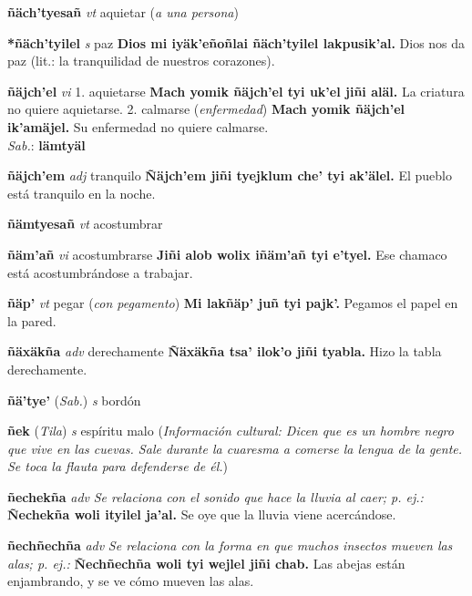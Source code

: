 \documentclass[10pt]{scrbook}
\newcommand{\entry}[1]{\textbf{#1}}
\newcommand{\onedefinition}[1]{#1.}
\newcommand{\nontranslationdef}[1]{\textit{#1}}
\newcommand{\partofspeech}[1]{\textit{#1}}
\newcommand{\spanishtranslation}[1]{#1}
\newcommand{\clarification}[1]{(\textit{#1})}
\newcommand{\cholexample}[1]{\textbf{#1}}
\newcommand{\exampletranslation}[1]{#1}
\newcommand{\dialectvariant}[1]{\\\textit{#1}:}
\newcommand{\dialectword}[1]{\textbf{#1}}
\newcommand{\relevantdialect}[1]{(\textit{#1})}
\newcommand{\culturalinformation}[1]{(\textit{#1})}
\begin{document}
\begin{multicols}{2}
\entry{ñäch'tyesañ}
\partofspeech{vt}
\spanishtranslation{aquietar}
\clarification{a una persona}

\entry{*ñäch'tyilel}
\partofspeech{s}
\spanishtranslation{paz}
\cholexample{Dios mi iyäk'eñoñlai ñäch'tyilel lakpusik'al.}
\exampletranslation{Dios nos da paz (lit.: la tranquilidad de nuestros corazones).}

\entry{ñäjch'el}
\partofspeech{vi}
\onedefinition{1}
\spanishtranslation{aquietarse}
\cholexample{Mach yomik ñäjch'el tyi uk'el jiñi aläl.}
\exampletranslation{La criatura no quiere aquietarse.}
\onedefinition{2}
\spanishtranslation{calmarse}
\clarification{enfermedad}
\cholexample{Mach yomik ñäjch'el ik'amäjel.}
\exampletranslation{Su enfermedad no quiere calmarse.}
\dialectvariant{Sab.}
\dialectword{lämtyäl}

\entry{ñäjch'em}
\partofspeech{adj}
\spanishtranslation{tranquilo}
\cholexample{Ñäjch'em jiñi tyejklum che' tyi ak'älel.}
\exampletranslation{El pueblo está tranquilo en la noche.}

\entry{ñämtyesañ}
\partofspeech{vt}
\spanishtranslation{acostumbrar}

\entry{ñäm'añ}
\partofspeech{vi}
\spanishtranslation{acostumbrarse}
\cholexample{Jiñi alob wolix iñäm'añ tyi e'tyel.}
\exampletranslation{Ese chamaco está acostumbrándose a trabajar.}

\entry{ñäp'}
\partofspeech{vt}
\spanishtranslation{pegar}
\clarification{con pegamento}
\cholexample{Mi lakñäp' juñ tyi pajk'.}
\exampletranslation{Pegamos el papel en la pared.}

\entry{ñäxäkña}
\partofspeech{adv}
\spanishtranslation{derechamente}
\cholexample{Ñäxäkña tsa' ilok'o jiñi tyabla.}
\exampletranslation{Hizo la tabla derechamente.}

\entry{ñä'tye'}
\relevantdialect{Sab.}
\partofspeech{s}
\spanishtranslation{bordón}

\entry{ñek}
\relevantdialect{Tila}
\partofspeech{s}
\spanishtranslation{espíritu malo}
\culturalinformation{Información cultural: Dicen que es un hombre negro que vive en las cuevas. Sale durante la cuaresma a comerse la lengua de la gente. Se toca la flauta para defenderse de él.}

\entry{ñechekña}
\partofspeech{adv}
\nontranslationdef{Se relaciona con el sonido que hace la lluvia al caer; p. ej.:}
\cholexample{Ñechekña woli ityilel ja'al.}
\exampletranslation{Se oye que la lluvia viene acercándose.}

\entry{ñechñechña}
\partofspeech{adv}
\nontranslationdef{Se relaciona con la forma en que muchos insectos mueven las alas; p. ej.:}
\cholexample{Ñechñechña woli tyi wejlel jiñi chab.}
\exampletranslation{Las abejas están enjambrando, y se ve cómo mueven las alas.}


\end{multicols}
\end{document}
